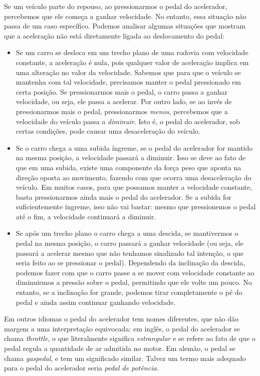 Se um veículo parte do repouso, ao pressionarmos o pedal do acelerador, percebemos que ele começa a ganhar velocidade. No entanto, essa situação não passa de um caso específico. Podemos analisar algumas situações que mostram que a aceleração não está diretamente ligada ao deslocamento do pedal:
\begin{itemize}
	\item Se um carro se desloca em um trecho plano de uma rodovia com velocidade constante, a aceleração é nula, pois qualquer valor de aceleração implica em uma alteração no valor da velocidade. Sabemos que para que o veículo se mantenha com tal velocidade, precisamos manter o pedal pressionado em certa posição. Se pressionarmos mais o pedal, o carro passa a ganhar velocidade, ou seja, ele passa a acelerar. Por outro lado, se ao invés de pressionarmos mais o pedal, pressionarmos \emph{menos}, percebemos que a velocidade do veículo passa a \emph{diminuir}. Isto é, o pedal do acelerador, sob certas condições, pode causar uma desaceleração do veículo.
	\item Se o carro chega a uma subida íngreme, se o pedal do acelerador for mantido na mesma posição, a velocidade passará a diminuir. Isso se deve ao fato de que em uma subida, existe uma componente da força peso que aponta na direção oposta ao movimento, fazendo com que ocorra uma desaceleração do veículo. Em muitos casos, para que possamos manter a velocidade constante, basta pressionarmos ainda mais o pedal do acelerador. Se a subida for suficientemente íngreme, isso não vai bastar: mesmo que pressionemos o pedal até o fim, a velocidade continuará a diminuir.
	\item Se após um trecho plano o carro chega a uma descida, se mantivermos o pedal na mesma posição, o carro passará a ganhar velocidade (ou seja, ele passará a acelerar mesmo que não tenhamos sinalizado tal intenção, o que seria feito ao se pressionar o pedal). Dependendo da inclinação da descida, podemos fazer com que o carro passe a se mover com velocidade constante ao diminuirmos a pressão sobre o pedal, permitindo que ele volte um pouco. No entanto, se a inclinação for grande, podemos tirar completamente o pé do pedal e ainda assim continuar ganhando velocidade.
\end{itemize}

Em outros idiomas o pedal do acelerador tem nomes diferentes, que não dão margem a uma interpretação equivocada: em inglês, o pedal do acelerador se chama \emph{throttle}, o que literalmente significa \emph{estrangular} e se refere ao fato de que o pedal regula a quantidade de ar admitida no motor. Em alemão, o pedal se chama \emph{gaspedal}, e tem um significado similar. Talvez um termo mais adequado para o pedal do acelerador seria \emph{pedal de potência}.%

